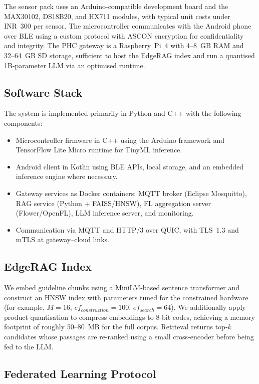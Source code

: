 \documentclass[conference]{IEEEtran}
\begin{document}
The sensor pack uses an Arduino-compatible development board and the MAX30102, DS18B20, and HX711 modules, with typical unit costs under INR~300 per sensor. The microcontroller communicates with the Android phone over BLE using a custom protocol with ASCON encryption for confidentiality and integrity. The PHC gateway is a Raspberry~Pi~4 with 4--8~GB RAM and 32--64~GB SD storage, sufficient to host the EdgeRAG index and run a quantised 1B-parameter LLM via an optimised runtime.

\subsection{Software Stack}

The system is implemented primarily in Python and C++ with the following components:
\begin{itemize}
  \item Microcontroller firmware in C++ using the Arduino framework and TensorFlow Lite Micro runtime for TinyML inference.
  \item Android client in Kotlin using BLE APIs, local storage, and an embedded inference engine where necessary.
  \item Gateway services as Docker containers: MQTT broker (Eclipse Mosquitto), RAG service (Python + FAISS/HNSW), FL aggregation server (Flower/OpenFL), LLM inference server, and monitoring.
  \item Communication via MQTT and HTTP/3 over QUIC, with TLS~1.3 and mTLS at gateway--cloud links.
\end{itemize}

\subsection{EdgeRAG Index}

We embed guideline chunks using a MiniLM-based sentence transformer and construct an HNSW index with parameters tuned for the constrained hardware (for example, $M=16$, $ef_{construction}=100$, $ef_{search}=64$). We additionally apply product quantisation to compress embeddings to 8-bit codes, achieving a memory footprint of roughly 50--80~MB for the full corpus. Retrieval returns top-$k$ candidates whose passages are re-ranked using a small cross-encoder before being fed to the LLM.

\subsection{Federated Learning Protocol}
\end{document}
